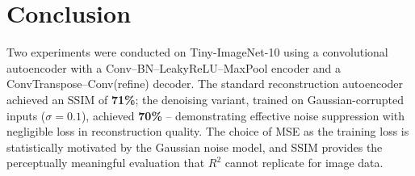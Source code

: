 \documentclass[12pt,a4paper]{article}
\begin{document}
\section*{Conclusion}

Two experiments were conducted on Tiny-ImageNet-10 using a convolutional
autoencoder with a Conv--BN--LeakyReLU--MaxPool encoder and a
ConvTranspose--Conv(refine) decoder. The standard reconstruction autoencoder
achieved an SSIM of \textbf{71\%}; the denoising variant, trained on
Gaussian-corrupted inputs ($\sigma=0.1$), achieved \textbf{70\%} -- demonstrating
effective noise suppression with negligible loss in reconstruction quality.
The choice of MSE as the training loss is statistically motivated by the
Gaussian noise model, and SSIM provides the perceptually meaningful evaluation
that $R^2$ cannot replicate for image data.
\end{document}
